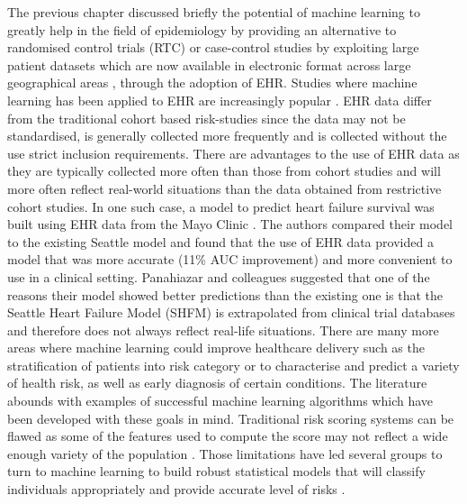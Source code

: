 The previous chapter discussed briefly the potential of machine learning to greatly help in the field of epidemiology by providing an alternative to randomised control trials (RTC) or case-control studies by exploiting large patient datasets which are now available in electronic format across large geographical areas \citep{Callahan:2017bz}, through the adoption of EHR. Studies where machine learning has been applied to EHR are increasingly popular \citep{Goldstein:2017bk}.\newline 
EHR data differ from the traditional cohort based risk-studies since the data may not be standardised, is generally collected more frequently and is collected without the use strict inclusion requirements.\newline
There are advantages to the use of EHR data as they are typically collected more often than those from cohort studies and will more often reflect real-world situations than the data obtained from restrictive cohort studies. In one such case, a model to predict heart failure survival was built using EHR data from the Mayo Clinic \citep{Panahiazar:2015gp}. The authors compared their model to the existing Seattle model and found that the use of EHR data provided a model that was more accurate (11\% AUC improvement) and more convenient to use in a clinical setting. Panahiazar and colleagues suggested that one of the reasons their model showed better predictions than the existing one is that the Seattle Heart Failure Model (SHFM) is extrapolated from clinical trial databases and therefore does not always reflect real-life situations.\newline
There are many more areas where machine learning could improve healthcare delivery such as the stratification of patients into risk category or to characterise and predict a variety of health risk, as well as early diagnosis of certain conditions. The literature abounds with examples of successful machine learning algorithms which have been developed with these goals in mind.\newline 
Traditional risk scoring systems can be flawed as some of the features used to compute the score may not reflect a wide enough variety of the population \citep{Besseling:2017bs}. Those limitations have led several groups to turn to machine learning to build robust statistical models that will classify individuals appropriately and provide accurate level of risks \citep{Callahan:2017bz, Besseling:2017bs}.\newline
